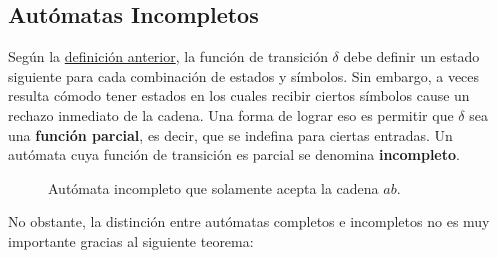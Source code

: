 \subsection{Autómatas Incompletos}

Según la \hyperref[definicion-afds]{definición anterior}, la función de transición $\delta$ debe definir un estado siguiente para cada combinación de estados y símbolos. Sin embargo, a veces resulta cómodo tener estados en los cuales recibir ciertos símbolos cause un rechazo inmediato de la cadena. Una forma de lograr eso es permitir que $\delta$ sea una \textbf{función parcial}, es decir, que se indefina para ciertas entradas. Un autómata cuya función de transición es parcial se denomina \textbf{incompleto}.

\begin{figure}[H]
    \centering
    \caption*{Autómata incompleto que solamente acepta la cadena $ab$.}
\end{figure}

No obstante, la distinción entre autómatas completos e incompletos no es muy importante gracias al siguiente teorema:

